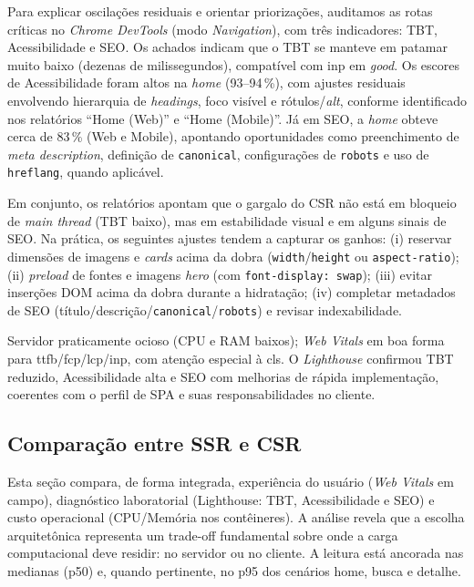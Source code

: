 {Para explicar oscilações residuais e orientar priorizações, auditamos as rotas críticas no \emph{Chrome DevTools} (modo \emph{Navigation}), com três indicadores: TBT, Acessibilidade e SEO. Os achados indicam que o TBT se manteve em patamar muito baixo (dezenas de milissegundos), compatível com \acrshort{inp} em \textit{good}. Os escores de Acessibilidade foram altos na \emph{home} (93--94\,\%), com ajustes residuais envolvendo hierarquia de \emph{headings}, foco visível e rótulos/\textit{alt}, conforme identificado nos relatórios “Home (Web)” e “Home (Mobile)”. Já em SEO, a \emph{home} obteve cerca de 83\,\% (Web e Mobile), apontando oportunidades como preenchimento de \emph{meta description}, definição de \texttt{canonical}, configurações de \texttt{robots} e uso de \texttt{hreflang}, quando aplicável.

Em conjunto, os relatórios apontam que o gargalo do CSR não está em bloqueio de \emph{main thread} (TBT baixo), mas em estabilidade visual e em alguns sinais de SEO. Na prática, os seguintes ajustes tendem a capturar os ganhos: (i) reservar dimensões de imagens e \emph{cards} acima da dobra (\texttt{width}/\texttt{height} ou \texttt{aspect-ratio}); (ii) \emph{preload} de fontes e imagens \emph{hero} (com \texttt{font-display: swap}); (iii) evitar inserções DOM acima da dobra durante a hidratação; (iv) completar metadados de SEO (título/descrição/\texttt{canonical}/\texttt{robots}) e revisar indexabilidade.

Servidor praticamente ocioso (CPU e RAM baixos); \emph{Web Vitals} em boa forma para \acrshort{ttfb}/\acrshort{fcp}/\acrshort{lcp}/\acrshort{inp}, com atenção especial à \acrshort{cls}. O \emph{Lighthouse} confirmou TBT reduzido, Acessibilidade alta e SEO com melhorias de rápida implementação, coerentes com o perfil de SPA e suas responsabilidades no cliente.

\subsection{Comparação entre SSR e CSR}
\label{subsec:comparacao-ssr-csr}

Esta seção compara, de forma integrada, experiência do usuário (\emph{Web Vitals} em campo), diagnóstico laboratorial (Lighthouse: TBT, Acessibilidade e SEO) e custo operacional (CPU/Memória nos contêineres). A análise revela que a escolha arquitetônica representa um trade-off fundamental sobre onde a carga computacional deve residir: no servidor ou no cliente. A leitura está ancorada nas medianas (p50) e, quando pertinente, no p95 dos cenários home, busca e detalhe.

}
